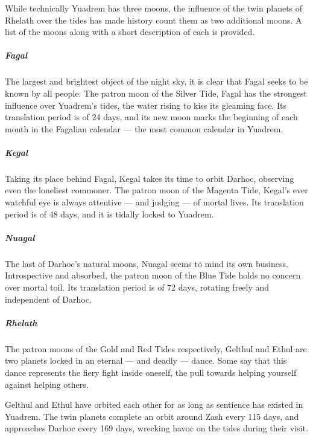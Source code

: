 While technically Yuadrem has three moons, the influence of the twin planets of Rhelath over the tides has made history count them as two additional moons.
A list of the moons along with a short description of each is provided.

\pagebreak

\subparagraph{Fagal} The largest and brightest object of the night sky, it is clear that Fagal seeks to be known by all people.
The patron moon of the Silver Tide, Fagal has the strongest influence over Yuadrem's tides, the water rising to kiss its gleaming face.
Its translation period is of 24 days, and its new moon marks the beginning of each month in the Fagalian calendar --- the most common calendar in Yuadrem.

\subparagraph{Kegal} Taking its place behind Fagal, Kegal takes its time to orbit Darhoc, observing even the loneliest commoner.
The patron moon of the Magenta Tide, Kegal's ever watchful eye is always attentive --- and judging --- of mortal lives.
Its translation period is of 48 days, and it is tidally locked to Yuadrem.

\subparagraph{Nuagal} The last of Darhoc's natural moons, Nuagal seems to mind its own business.
Introspective and absorbed, the patron moon of the Blue Tide holds no concern over mortal toil.
Its translation period is of 72 days, rotating freely and independent of Darhoc.

\subparagraph{Rhelath} The patron moons of the Gold and Red Tides respectively, Gelthul and Ethul are two planets locked in an eternal --- and deadly --- dance.
Some say that this dance represents the fiery fight inside oneself, the pull towards helping yourself against helping others.

Gelthul and Ethul have orbited each other for as long as sentience has existed in Yuadrem.%
The twin planets complete an orbit around Zash every 115 days, and approaches Darhoc every 169 days, wrecking havoc on the tides during their visit.

\pagebreak
